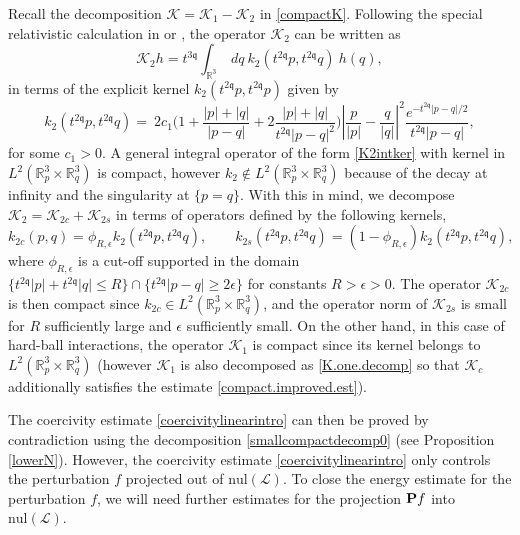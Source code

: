 \documentclass[reqno]{amsart}
\newcommand{\pv}{p}
\newcommand{\pZ}{|\pv|}
\newcommand{\qv}{q}
\newcommand{\qZ}{|\qv|}
\newcommand{\qq}{\mathfrak{q}}
\newcommand{\tqq}{t^{2\qq}}
\newcommand{\compK}{\mathcal{K}}
\newcommand{\linL}{\mathcal{L}}
\newcommand{\CN}{\mathrm{nul}}
\theoremstyle{definition}
\numberwithin{equation}{section}
\numberwithin{theorem}{section}
\begin{document}
Recall the decomposition \(\mathcal{K}=\mathcal{K}_1-\mathcal{K}_2\) in \eqref{compactK}. Following the special relativistic calculation in \cite[Appendix]{MR2728733} or \cite{MR635279}, the operator \(\mathcal{K}_2\) can be written as
\begin{equation}\label{K2intker}
      \compK_2 h =     t^{3\qq}\int_{\mathbb{R}^3} ~  dq ~
k_{2}(\tqq p,\tqq q) ~ h(\qv),
\end{equation}
in terms of the explicit kernel \(k_2(t^{2\qq}p,t^{2\qq}p)\) given by
\[k_2(\tqq p,\tqq q) = ~
2c_1\bigg(1+\frac{|p|+|q|}{|p-q|}+2\frac{|p|+|q|}{t^{2\qq}|p-q|^2}\bigg)\left| \frac{\pv}{\pZ} -\frac{\qv}{\qZ}\right|^2
 \frac{e^{ -t^{2\qq} |p-q|/2}}{t^{2\qq}|p-q|},\]
for some $c_1>0$. A general integral operator of the form \eqref{K2intker} with kernel in \(L^2(\mathbb{R}^3_p\times \mathbb{R}^3_q)\) is compact, however \(k_2 \notin L^2(\mathbb{R}^3_p\times \mathbb{R}^3_q)\) because of the decay at infinity and the singularity at \(\{p=q\}\). With this in mind, we decompose \(\compK_2=\compK_{2c}+\compK_{2s}\) in terms of operators defined by the following kernels, 
\[
k_{2c}(p,q)=\phi_{R, \epsilon} k_2(\tqq p,\tqq q),\qquad k_{2s}(\tqq p,\tqq q)= (1-\phi_{R, \epsilon})k_2(\tqq p,\tqq q),
\]
where \(\phi_{R, \epsilon}\) is a cut-off supported in the domain \(\{t^{2\qq}|p|+t^{2\qq}|q|\leq R\}\cap \{ t^{2\qq}|p-q|\geq 2\epsilon\}\) for constants \(R>\epsilon>0\). The operator \(\compK_{2c}\) is then compact since \(k_{2c}\in L^2(\mathbb{R}^3_p\times \mathbb{R}^3_q)\), and the operator norm of \(\compK_{2s}\) is small for \(R\) sufficiently large and \(\epsilon\) sufficiently small. On the other hand, in this case of hard-ball interactions, the operator \(\mathcal{K}_1\) is compact since its kernel belongs to \(L^2(\mathbb{R}^3_p\times \mathbb{R}^3_q)\) (however \(\mathcal{K}_1\) is also decomposed as \eqref{K.one.decomp} so that \(\mathcal{K}_c\) additionally satisfies the estimate \eqref{compact.improved.est}). 




The coercivity estimate \eqref{coercivitylinearintro} can then be proved by contradiction using the decomposition \eqref{smallcompactdecomp0} (see Proposition \ref{lowerN}). However, the coercivity estimate \eqref{coercivitylinearintro} only controls the perturbation \(f\) projected out of ${\CN}(\linL)$. To close the energy estimate for the perturbation \(f\), we will need further estimates for the projection \({\bf P}f\) into ${\CN}(\linL)$. 
\end{document}

